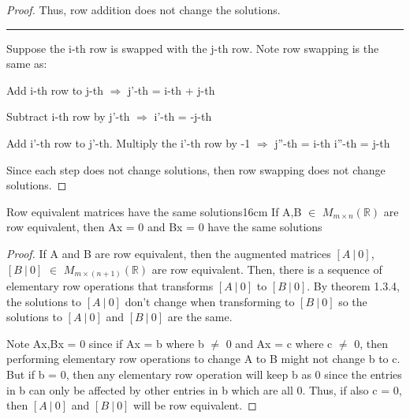 \begin{proof}
        Thus, row addition does not change the solutions.

        \rule[0.1cm]{16.7cm}{0.01cm}

        Suppose the i-th row is swapped with the j-th row.
        Note row swapping is the same as:

        \hspace{0.5cm}
        Add i-th row to j-th
        \hspace{0.5cm}
        $\Rightarrow$
        \hspace{0.5cm}
        j'-th = i-th + j-th

        \hspace{0.5cm}
        Subtract i-th row by j'-th
        \hspace{0.5cm}
        $\Rightarrow$
        \hspace{0.5cm}
        i'-th = -j-th

        \hspace{0.5cm}
        Add i'-th row to j'-th.
        Multiply the i'-th row by -1
        \hspace{0.5cm}
        $\Rightarrow$
        \hspace{0.5cm}
        j''-th = i-th
        \hspace{0.5cm}
        i''-th = j-th

        Since each step does not change solutions,
        then row swapping does not change solutions.
    \end{proof}

    \vspace{0.5cm}



    \begin{wtheorem}{Row equivalent matrices have the same solutions}{16cm}
        If A,B $\in$ $M_{m \times n}(\mathbb{R})$
        are row equivalent, then Ax = 0 and Bx = 0
        have the same solutions
    \end{wtheorem}

    \begin{proof}
        If A and B are row equivalent, then the augmented matrices
        $[A \ | \ 0]$,$[B \ | \ 0]$ $\in$ $M_{m \times (n+1)}(\mathbb{R})$
        are row equivalent.
        Then, there is a sequence of elementary
        row operations that transforms $[A \ | \ 0]$ to $[B \ | \ 0]$.
        By {\color{red} theorem 1.3.4}, the solutions to $[A \ | \ 0]$
        don't change when transforming to $[B \ | \ 0]$
        so the solutions to $[A \ | \ 0]$ and $[B \ | \ 0]$ are the same.

        Note Ax,Bx = 0 since if Ax = b where b $\not =$ 0
        and Ax = c where c $\not =$ 0,
        then performing elementary row operations to change A to B might
        not change b to c. But if b = 0, then any elementary row operation will
        keep b as 0 since the entries in b can only be affected by other entries
        in b which are all 0. Thus, if also c = 0, then $[A \ | \ 0]$
        and $[B \ | \ 0]$ will be row equivalent.
    \end{proof}

